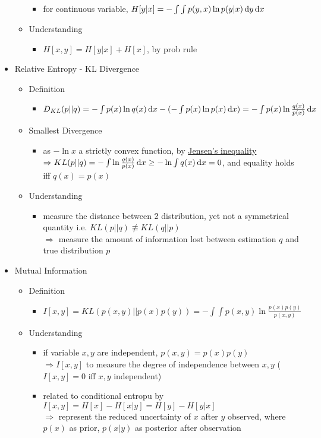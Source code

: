 \begin{itemize}
\begin{itemize}
\begin{itemize}
		\item for continuous variable, $H[y|x] = -\int\int p(y, x)\ln p(y|x) \mathop{}\!\mathrm{d} y\mathop{}\!\mathrm{d} x$
		\end{itemize}
	\item Understanding
		\begin{itemize}
		\item $H[x, y] = H[y|x] + H[x]$, by prob rule
		\end{itemize}
	\end{itemize}
\item Relative Entropy - KL Divergence
	\begin{itemize}
	\item Definition
		\begin{itemize}
		\item $D_{KL}(p||q) = -\int p(x)\ln q(x)\mathop{}\!\mathrm{d} x - (-\int p(x)\ln p(x)\mathop{}\!\mathrm{d} x) = -\int p(x)\ln \frac{q(x)}{p(x)} \mathop{}\!\mathrm{d} x$
		\end{itemize}
	\item Smallest Divergence
		\begin{itemize}
		\item as $-\ln x$ a strictly convex function, by \hyperref[Math_Calc_Jensen]{Jensen's inequality} \\
		$\Rightarrow KL(p||q) = -\int \ln \frac{q(x)}{p(x)} \mathop{}\!\mathrm{d} x \ge -\ln\int q(x) \mathop{}\!\mathrm{d} x = 0$, and equality holds iff $q(x)=p(x)$
		\end{itemize}
	\item Understanding
		\begin{itemize}
		\item measure the distance between 2 distribution, yet not a symmetrical quantity i.e. $KL(p||q) \not\equiv KL(q||p)$ \\
		$\Rightarrow$ measure the amount of information lost between estimation $q$ and true distribution $p$
		\end{itemize}
	\end{itemize}
\item Mutual Information
	\begin{itemize}
	\item Definition
		\begin{itemize}
		\item $I[x,y] = KL(p(x,y) || p(x)p(y)) = -\int\int p(x,y) \ln \frac{p(x)p(y)}{p(x,y)}$
		\end{itemize}
	\item Understanding
		\begin{itemize}
		\item if variable $x,y$ are independent, $p(x,y) = p(x)p(y)$ \\
		$\Rightarrow I[x,y]$ to measure the degree of independence between $x, y$ ($I[x,y]=0$ iff $x,y$ independent)
		\item related to conditional entropu by $I[x,y] = H[x] - H[x|y] = H[y] - H[y|x]$ \\
		$\Rightarrow$ represent the reduced uncertainty of $x$ after $y$ observed, where $p(x)$ as prior, $p(x|y)$ as posterior after observation
		\end{itemize}
	\end{itemize}
\end{itemize}


